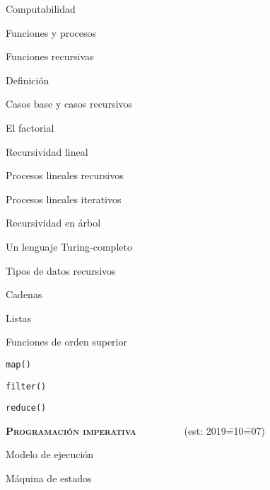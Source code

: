 \begin{longenum}
\begin{longenum}
        \item Computabilidad
        \begin{longenum}
            \item Funciones y procesos
            \item Funciones recursivas
            \begin{longenum}
                \item Definición
                \item Casos base y casos recursivos
                \item El factorial
                \item Recursividad lineal
                \begin{longenum}
                    \item Procesos lineales recursivos
                    \item Procesos lineales iterativos
                \end{longenum}
                \item Recursividad en árbol
            \end{longenum}
            \item Un lenguaje Turing-completo
        \end{longenum}
        \item Tipos de datos recursivos
        \begin{longenum}
            \item Cadenas
            \item Listas
        \end{longenum}
        \item Funciones de orden superior
        \begin{longenum}
            \item \texttt{map()}
            \item \texttt{filter()}
            \item \texttt{reduce()}
        \end{longenum}
    \end{longenum}
    \item \textbf{\textsc{Programación imperativa}} \ \ \ \ \ \ \ \ \ (est: 2019\==10\==07)
    \begin{longenum}
        \item Modelo de ejecución
        \begin{longenum}
            \item Máquina de estados

\end{longenum}
\end{longenum}
\end{longenum}

